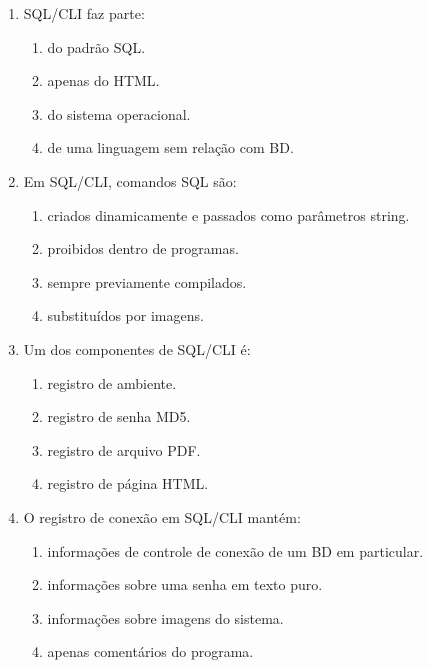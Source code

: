 \documentclass[12pt,a4paper]{article}
\begin{document}
\begin{enumerate}[label=\textbf{Q\arabic*.}]
\begin{enumerate}[label=\alph*)]
    \item Call Level Interface.
    \item Command Line Internet.
    \item Create Logic Index.
    \item Control Language Instance.
\end{enumerate}

\item SQL/CLI faz parte:

\begin{enumerate}[label=\alph*)]
    \item do padrão SQL.
    \item apenas do HTML.
    \item do sistema operacional.
    \item de uma linguagem sem relação com BD.
\end{enumerate}

\item Em SQL/CLI, comandos SQL são:

\begin{enumerate}[label=\alph*)]
    \item criados dinamicamente e passados como parâmetros string.
    \item proibidos dentro de programas.
    \item sempre previamente compilados.
    \item substituídos por imagens.
\end{enumerate}

\item Um dos componentes de SQL/CLI é:

\begin{enumerate}[label=\alph*)]
    \item registro de ambiente.
    \item registro de senha MD5.
    \item registro de arquivo PDF.
    \item registro de página HTML.
\end{enumerate}

\item O registro de conexão em SQL/CLI mantém:

\begin{enumerate}[label=\alph*)]
    \item informações de controle de conexão de um BD em particular.
    \item informações sobre uma senha em texto puro.
    \item informações sobre imagens do sistema.
    \item apenas comentários do programa.
\end{enumerate}


\end{enumerate}
\end{document}
